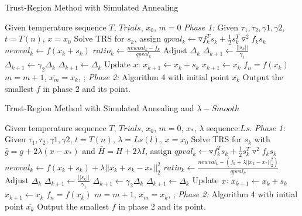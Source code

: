 \documentclass[letterpaper,12pt,titlepage,oneside,final]{book}
\begin{document}
\begin{algorithm} [H]
\caption{Trust-Region Method with Simulated Annealing }
\begin{algorithmic} 
\STATE Given temperature sequence $T$, $Trials$, $x_0$, $m=0$
\STATE \emph{Phase 1:}
\STATE Given $\tau_1, \tau_2, \gamma1, \gamma2$, $t=T(n)$, $x=x_0$
\STATE  Solve TRS for $s_k$, assign $qpval_k \leftarrow \triangledown  f^T_ks_k+\frac{1}{2}s^T_k \triangledown^2f_ks_k$
\STATE  $newval_k\leftarrow f(x_k+s_k)$
\STATE  $ratio_k\leftarrow \frac{newval_k-f_k}{qpval_k}$
\STATE  Adjust $\Delta_k$
\STATE $\Delta_{k+1}\leftarrow \frac{||s_k||}{\gamma_1}$
\ELSE 
{}
\STATE $\Delta_{k+1}\leftarrow \gamma_2 \Delta_k$
\ELSE 
\STATE $\Delta_{k+1}\leftarrow \Delta_k$
\ENDIF
\ENDIF
\STATE Update $x$:
\STATE $x_{k+1}\leftarrow x_k+s_k$
\ELSE 
\STATE $x_{k+1}\leftarrow x_k$
\ENDIF
\ENDWHILE
\STATE $f_n=f(x_k)$
\STATE $m=m+1$, $\overline{x_m}=x_k$, ;
\ENDIF
\ENDFOR
\STATE  
\STATE \emph{Phase 2:}
\STATE Algorithm 4 with initial point $\overline{x_k}$
\ENDFOR
\STATE Output the smallest $f$ in phase 2 and its point.
\end{algorithmic}
\end{algorithm}

\begin{algorithm} [H]
\caption{Trust-Region Method with Simulated Annealing and $\lambda-Smooth$}
\begin{algorithmic} 
\STATE Given temperature sequence $T$, $Trials$, $x_0$, $m=0$, $x_*$, $\lambda$ sequence:$Ls$.
\STATE \emph{Phase 1:}
\STATE Given $\tau_1, \tau_2, \gamma1, \gamma2$, $t=T(n)$, $\lambda=Ls(l)$, $x=x_0$
\STATE  Solve TRS for $s_k$ with $\bar{g}=g+2\lambda(x-x_*)$ and $\bar{H}=H+2\lambda I$, assign $qpval_k \leftarrow \triangledown  f^T_ks_k+\frac{1}{2}s^T_k \triangledown^2f_ks_k$
\STATE  $newval_k\leftarrow f(x_k+s_k)+\lambda||x_k+s_k-x_*||_2^2$
\STATE  $ratio_k\leftarrow \frac{newval_k-(f_k+\lambda||x_k-x_*||_2^2)}{qpval_k}$
\STATE  Adjust $\Delta_k$
\STATE $\Delta_{k+1}\leftarrow \frac{||s_k||}{\gamma_1}$
\ELSE 
{}
\STATE $\Delta_{k+1}\leftarrow \gamma_2 \Delta_k$
\ELSE 
\STATE $\Delta_{k+1}\leftarrow \Delta_k$
\ENDIF
\ENDIF
\STATE Update $x$:
\STATE $x_{k+1}\leftarrow x_k+s_k$
\ELSE 
\STATE $x_{k+1}\leftarrow x_k$
\ENDIF
\ENDWHILE
\STATE $f_n=f(x_k)$
\STATE $m=m+1$, $\overline{x_m}=x_k$, ;
\ENDIF
\ENDFOR
\ENDFOR
\STATE  
\STATE \emph{Phase 2:}
\STATE Algorithm 4 with initial point $\overline{x_k}$
\ENDFOR
\STATE Output the smallest $f$ in phase 2 and its point.
\end{algorithmic}
\end{algorithm}
\end{document}
